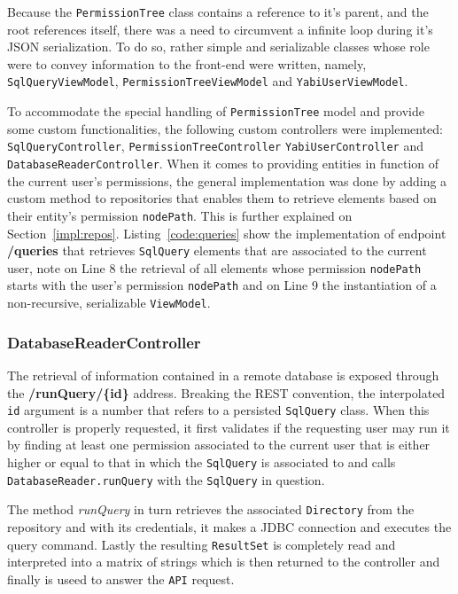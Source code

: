 Because the \texttt{PermissionTree} class contains a reference to it's parent, and the root references itself, there was a need to circumvent a infinite loop during it's \gls{JSON} serialization. To do so, rather simple and 
serializable classes whose role were to convey information to the front-end were written, namely, \texttt{SqlQueryViewModel}, \texttt{PermissionTreeViewModel} and \texttt{YabiUserViewModel}.

To accommodate the special handling of \texttt{PermissionTree} model and provide some custom functionalities, the following custom controllers were implemented: \texttt{SqlQueryController}, \texttt{PermissionTreeController} \texttt{YabiUserController} and \texttt{DatabaseReaderController}. When it comes to providing entities in function of the current user's permissions, the general implementation was done by adding a custom method to repositories that enables them to retrieve elements based on their entity's permission \texttt{nodePath}. This is further explained on Section~\ref{impl:repos}. Listing~\ref{code:queries} show the implementation of endpoint \textbf{/queries} that retrieves \texttt{SqlQuery} elements that are associated to the current user, note on Line 8 the retrieval of all elements whose permission \texttt{nodePath} starts with the user's permission \texttt{nodePath} and on Line 9 the instantiation of a non-recursive, serializable \texttt{ViewModel}.



\subsubsection{DatabaseReaderController}
The retrieval of information contained in a remote database is exposed through the \textbf{/runQuery/\{id\}} address. Breaking the \gls{REST} convention, the interpolated \texttt{id} argument is a number that refers to a persisted \texttt{SqlQuery} class. When this controller is properly requested, it first validates if the requesting user may run it by finding at least one permission associated to the current user that is either higher or equal to that in which the \texttt{SqlQuery} is associated to and calls \texttt{DatabaseReader.runQuery} with the \texttt{SqlQuery} in question.

The method \textit{runQuery} in turn retrieves the associated \texttt{Directory} from the repository and with its credentials, it makes a \gls{JDBC} connection and executes the query command. Lastly the resulting \texttt{ResultSet} is completely read and interpreted into a matrix of strings which is then returned to the controller and finally is useed to answer the \texttt{API} request.

